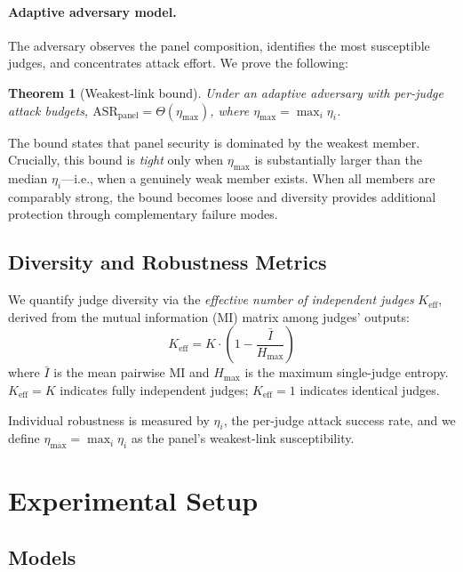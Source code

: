 \documentclass[11pt]{article}
\newtheorem{theorem}{Theorem}
\begin{document}
\paragraph{Adaptive adversary model.}
The adversary observes the panel composition, identifies the most susceptible judges, and concentrates attack effort.
We prove the following:

\begin{theorem}[Weakest-link bound]
Under an adaptive adversary with per-judge attack budgets, $\mathrm{ASR}_{\mathrm{panel}} = \Theta(\eta_{\max})$, where $\eta_{\max} = \max_i \eta_i$.
\end{theorem}

The bound states that panel security is dominated by the weakest member.
Crucially, this bound is \emph{tight} only when $\eta_{\max}$ is substantially larger than the median $\eta_i$---i.e., when a genuinely weak member exists.
When all members are comparably strong, the bound becomes loose and diversity provides additional protection through complementary failure modes.

\subsection{Diversity and Robustness Metrics}

We quantify judge diversity via the \emph{effective number of independent judges} $K_{\text{eff}}$, derived from the mutual information (MI) matrix among judges' outputs:
\begin{equation}
K_{\text{eff}} = K \cdot \left(1 - \frac{\bar{I}}{H_{\max}}\right)
\end{equation}
where $\bar{I}$ is the mean pairwise MI and $H_{\max}$ is the maximum single-judge entropy.
$K_{\text{eff}} = K$ indicates fully independent judges; $K_{\text{eff}} = 1$ indicates identical judges.

Individual robustness is measured by $\eta_i$, the per-judge attack success rate, and we define $\eta_{\max} = \max_i \eta_i$ as the panel's weakest-link susceptibility.

\section{Experimental Setup}

\subsection{Models}
\end{document}

